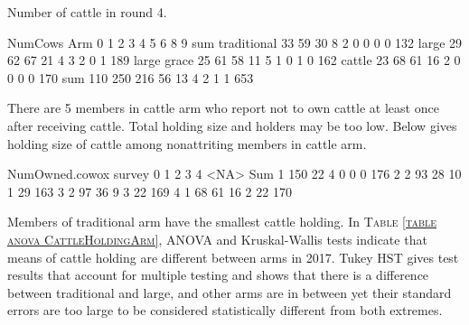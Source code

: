 Number of cattle in round 4.
\begin{Schunk}
\begin{Soutput}
             NumCows
Arm             0   1   2   3   4   5   6   8   9 sum
  traditional  33  59  30   8   2   0   0   0   0 132
  large        29  62  67  21   4   3   2   0   1 189
  large grace  25  61  58  11   5   1   0   1   0 162
  cattle       23  68  61  16   2   0   0   0   0 170
  sum         110 250 216  56  13   4   2   1   1 653
\end{Soutput}
\end{Schunk}
There are 5 members in \textsf{cattle} arm who report not to own cattle at least once after receiving cattle. Total holding size and holders may be too low. Below gives holding size of cattle among nonattriting members in \textsf{cattle} arm.
\begin{Schunk}
\begin{Soutput}
      NumOwned.cowox
survey   0   1   2   3   4 <NA> Sum
     1 150  22   4   0   0    0 176
     2   2  93  28  10   1   29 163
     3   2  97  36   9   3   22 169
     4   1  68  61  16   2   22 170
\end{Soutput}
\end{Schunk}
Members of \textsf{traditional} arm have the smallest cattle holding. In \textsc{\small Table \ref{table anova CattleHoldingArm}}, ANOVA and Kruskal-Wallis tests indicate that means of cattle holding are different between arms in 2017. Tukey HST gives test results that account for multiple testing and shows that there is a difference between \textsf{traditional} and \textsf{large}, and other arms are in between yet their standard errors are too large to be considered statistically different from both extremes.

